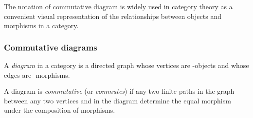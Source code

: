\documentclass[12pt,a4paper]{report}
\theoremstyle{definition}
\begin{document}
            The notation of commutative diagram is widely used in category theory as a convenient visual representation of the relationships between objects and morphisms in a category.
            \subsubsection{Commutative diagrams}
            A \emph{diagram} in a category  is a directed graph whose vertices are -objects and whose edges are -morphisms.

            A diagram is \emph{commutative} (or \emph{commutes}) if any two finite paths in the graph between any two vertices  and  in the diagram determine the equal morphism  under the composition of morphisms.
\end{document}
